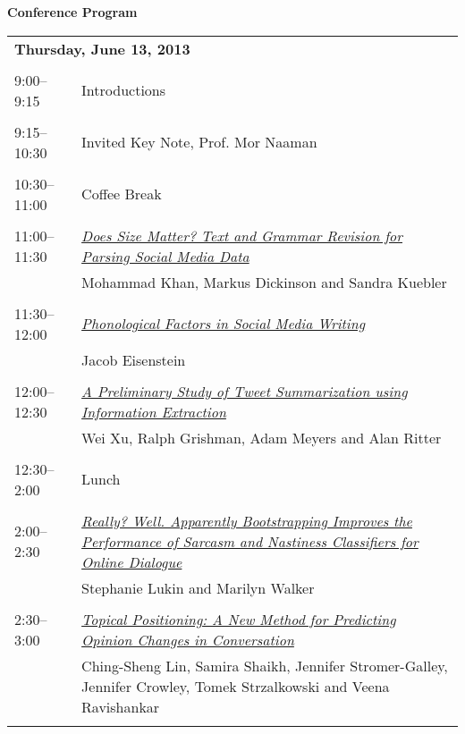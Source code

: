 \setlength{\parindent}{0in}
\setlength{\parskip}{2ex}
\renewcommand{\baselinestretch}{0.87}

\begin{center}
{\Large \bf
  Conference Program
}
\end{center}
\vspace{3mm}
\begin{tabular}{p{20mm}p{128mm}}
\multicolumn{2}{l}{\bf Thursday, June 13, 2013} \\
\\
9:00--9:15 & Introductions \\
\\
9:15--10:30 & Invited Key Note, Prof. Mor Naaman \\
\\
10:30--11:00 & Coffee Break \\
\\
11:00--11:30 & \hyperlink{page.1}{\em Does Size Matter? Text and Grammar Revision for Parsing Social Media Data}\\
         & Mohammad Khan, Markus Dickinson and Sandra Kuebler \\
\\

11:30--12:00 & \hyperlink{page.11}{\em Phonological Factors in Social Media Writing}\\
         & Jacob Eisenstein \\
\\

12:00--12:30 & \hyperlink{page.20}{\em A Preliminary Study of Tweet Summarization using Information Extraction}\\
         & Wei Xu, Ralph Grishman, Adam Meyers and Alan Ritter \\
\\

12:30--2:00 & Lunch \\
\\
2:00--2:30 & \hyperlink{page.30}{\em Really? Well. Apparently Bootstrapping Improves the Performance of Sarcasm and Nastiness Classifiers for Online Dialogue}\\
         & Stephanie Lukin and Marilyn Walker \\
\\

2:30--3:00 & \hyperlink{page.41}{\em Topical Positioning: A New Method for Predicting Opinion Changes in Conversation}\\
         & Ching-Sheng Lin, Samira Shaikh, Jennifer Stromer-Galley, Jennifer Crowley, Tomek Strzalkowski and Veena Ravishankar \\
\\


\end{tabular}
